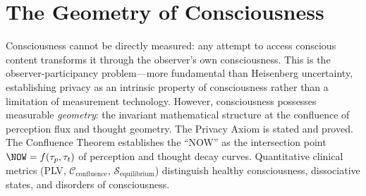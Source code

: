 \chapter{The Geometry of Consciousness}
\label{ch:geometry}


\begin{chapterabstract}
Consciousness cannot be directly measured: any attempt to access conscious content transforms it through the observer's own consciousness. This is the observer-participancy problem---more fundamental than Heisenberg uncertainty, establishing privacy as an intrinsic property of consciousness rather than a limitation of measurement technology. However, consciousness possesses measurable \emph{geometry}: the invariant mathematical structure at the confluence of perception flux and thought geometry. The Privacy Axiom is stated and proved. The Confluence Theorem establishes the ``NOW'' as the intersection point $\NOW = f(\tau_p, \tau_t)$ of perception and thought decay curves. Quantitative clinical metrics (PLV, $\mathcal{C}_{\mathrm{confluence}}$, $\mathcal{S}_{\mathrm{equilibrium}}$) distinguish healthy consciousness, dissociative states, and disorders of consciousness.
\end{chapterabstract}


